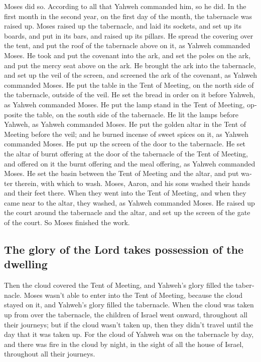 \begin{paracol}{2}
\begin{otherlanguage}{english}
 Moses did so. According to all that Yahweh commanded
him, so he did.  In the first month in the second year,
on the first day of the month, the tabernacle was raised up.
 Moses raised up the tabernacle, and laid its sockets,
and set up its boards, and put in its bars, and raised up its pillars.
 He spread the covering over the tent, and put the roof
of the tabernacle above on it, as Yahweh commanded Moses.
 He took and put the covenant into the ark, and set the
poles on the ark, and put the mercy seat above on the ark.
 He brought the ark into the tabernacle, and set up the
veil of the screen, and screened the ark of the covenant, as Yahweh
commanded Moses.  He put the table in the Tent of
Meeting, on the north side of the tabernacle, outside of the veil.
 He set the bread in order on it before Yahweh, as Yahweh
commanded Moses.  He put the lamp stand in the Tent of
Meeting, opposite the table, on the south side of the tabernacle.
 He lit the lamps before Yahweh, as Yahweh commanded
Moses.  He put the golden altar in the Tent of Meeting
before the veil;  and he burned incense of sweet spices
on it, as Yahweh commanded Moses.  He put up the screen
of the door to the tabernacle.  He set the altar of burnt
offering at the door of the tabernacle of the Tent of Meeting, and
offered on it the burnt offering and the meal offering, as Yahweh
commanded Moses.  He set the basin between the Tent of
Meeting and the altar, and put water therein, with which to wash.
 Moses, Aaron, and his sons washed their hands and their
feet there.  When they went into the Tent of Meeting, and
when they came near to the altar, they washed, as Yahweh commanded
Moses.  He raised up the court around the tabernacle and
the altar, and set up the screen of the gate of the court. So Moses
finished the work.

\hypertarget{the-glory-of-the-lord-takes-possession-of-the-dwelling}{%
\subsection{The glory of the Lord takes possession of the
dwelling}\label{the-glory-of-the-lord-takes-possession-of-the-dwelling}}

 Then the cloud covered the Tent of Meeting, and Yahweh's
glory filled the tabernacle.  Moses wasn't able to enter
into the Tent of Meeting, because the cloud stayed on it, and Yahweh's
glory filled the tabernacle.  When the cloud was taken up
from over the tabernacle, the children of Israel went onward, throughout
all their journeys;  but if the cloud wasn't taken up,
then they didn't travel until the day that it was taken up.
 For the cloud of Yahweh was on the tabernacle by day,
and there was fire in the cloud by night, in the sight of all the house
of Israel, throughout all their journeys. \end{otherlanguage}
\end{paracol}
